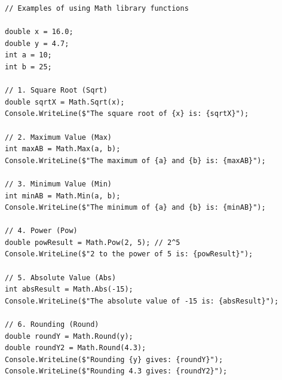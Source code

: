 \documentclass[14pt]{extarticle}
\begin{document}
\begin{boxExample}
\begin{english}
\begin{verbatim}
// Examples of using Math library functions

double x = 16.0;
double y = 4.7;
int a = 10;
int b = 25;

// 1. Square Root (Sqrt)
double sqrtX = Math.Sqrt(x);
Console.WriteLine($"The square root of {x} is: {sqrtX}");

// 2. Maximum Value (Max)
int maxAB = Math.Max(a, b);
Console.WriteLine($"The maximum of {a} and {b} is: {maxAB}");

// 3. Minimum Value (Min)
int minAB = Math.Min(a, b);
Console.WriteLine($"The minimum of {a} and {b} is: {minAB}");

// 4. Power (Pow)
double powResult = Math.Pow(2, 5); // 2^5
Console.WriteLine($"2 to the power of 5 is: {powResult}");

// 5. Absolute Value (Abs)
int absResult = Math.Abs(-15);
Console.WriteLine($"The absolute value of -15 is: {absResult}");

// 6. Rounding (Round)
double roundY = Math.Round(y);
double roundY2 = Math.Round(4.3);
Console.WriteLine($"Rounding {y} gives: {roundY}");
Console.WriteLine($"Rounding 4.3 gives: {roundY2}");
\end{verbatim}
\end{english}
\end{boxExample}
\end{document}
